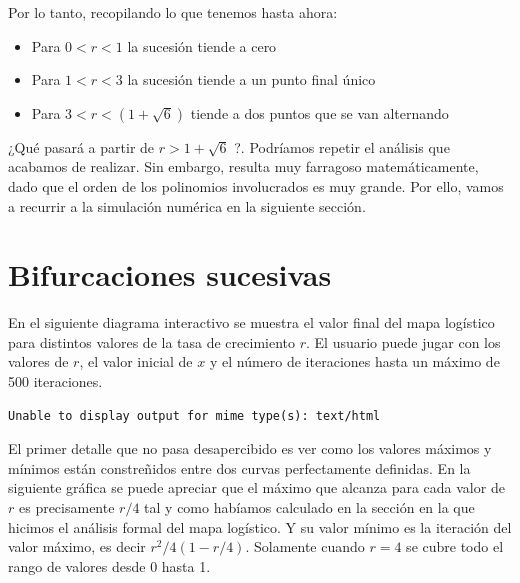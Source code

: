 \documentclass[
  10pt,
  a4paper,
  DIV=11,
  numbers=noendperiod,
  open=any]{scrreprt}
\providecommand{\tightlist}{%
  \setlength{\itemsep}{0pt}\setlength{\parskip}{0pt}}
\numberwithin{equation}{chapter}
\numberwithin{equation}{chapter}
\renewcommand{\[}{\begin{equation}}
\renewcommand{\]}{\end{equation}}
\begin{document}
Por lo tanto, recopilando lo que tenemos hasta ahora:

\begin{itemize}
\tightlist
\item
  Para \(0 < r < 1\) la sucesión tiende a cero
\item
  Para \(1 < r < 3\) la sucesión tiende a un punto final único
\item
  Para \(3 < r < (1 + \sqrt{6})\) tiende a dos puntos que se van
  alternando
\end{itemize}

¿Qué pasará a partir de \(r > 1 + \sqrt{6}\) ?. Podríamos repetir el
análisis que acabamos de realizar. Sin embargo, resulta muy farragoso
matemáticamente, dado que el orden de los polinomios involucrados es muy
grande. Por ello, vamos a recurrir a la simulación numérica en la
siguiente sección.


\chapter{Bifurcaciones sucesivas}\label{bifurcaciones-sucesivas}

En el siguiente diagrama interactivo se muestra el valor final del mapa
logístico para distintos valores de la tasa de crecimiento \(r\). El
usuario puede jugar con los valores de \(r\), el valor inicial de \(x\)
y el número de iteraciones hasta un máximo de 500 iteraciones.

\begin{verbatim}
Unable to display output for mime type(s): text/html
\end{verbatim}

El primer detalle que no pasa desapercibido es ver como los valores
máximos y mínimos están constreñidos entre dos curvas perfectamente
definidas. En la siguiente gráfica se puede apreciar que el máximo que
alcanza para cada valor de \(r\) es precisamente \(r/4\) tal y como
habíamos calculado en la sección en la que hicimos el análisis formal
del mapa logístico. Y su valor mínimo es la iteración del valor máximo,
es decir \(r^2/4(1-r/4)\). Solamente cuando \(r=4\) se cubre todo el
rango de valores desde 0 hasta 1.
\end{document}
